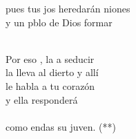 \begin{cancion}
	pues tus jos heredarán niones\\
	y un pblo de Dios formar  \\\jump\\
	\begin{chorus}%
	Por eso , la  a seducir\\
	la lleva al dierto y allí\\
	le habla a tu corazón \\
	y ella  responderá\\
{}\vspace*{-0.4cm}\\
	como endas su juven. (**)\\
	\end{chorus}%
	\jump\\
\end{cancion}%
